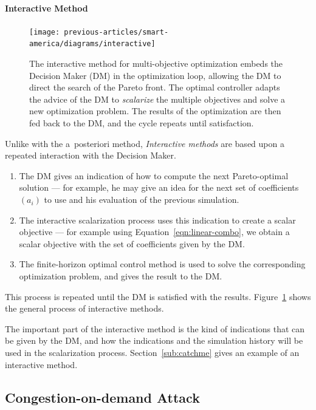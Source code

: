 			\paragraph{Interactive Method}
				\begin{figure}[ht]
					\centering
					  \texttt{[image: previous-articles/smart-america/diagrams/interactive]}
					\caption{The interactive method for multi-objective optimization embeds the Decision Maker (DM) in the optimization loop, allowing the DM to direct the search of the Pareto front. The optimal controller adapts the advice of the DM to \emph{scalarize} the multiple objectives and solve a new optimization problem. The results of the optimization are then fed back to the DM, and the cycle repeats until satisfaction.}
					\label{fig:interactive}
				\end{figure}
				Unlike with the a~posteriori method, \emph{Interactive methods} are based upon a repeated interaction with the Decision Maker.
				\begin{enumerate}
					\item The DM gives an indication of how to compute the next Pareto-optimal solution --- for example, he may give an idea for the next set of coefficients $(a_i)$ to use and his evaluation of the previous simulation.
					\item The interactive scalarization process uses this indication to create a scalar objective --- for example using Equation~\eqref{eqn:linear-combo}, we obtain a scalar objective with the set of coefficients given by the DM.
					\item The finite-horizon optimal control method is used to solve the corresponding optimization problem, and gives the result to the DM.
				\end{enumerate}
				This process is repeated until the DM is satisfied with the results. Figure~\ref{fig:interactive} shows the general process of interactive methods.

				The important part of the interactive method is the kind of indications that can be given by the DM, and how the indications and the simulation history will be used in the scalarization process. Section~\ref{sub:catchme} gives an example of an interactive method.

\subsection{Congestion-on-demand Attack}
\label{sub:congestion-on-demand}

